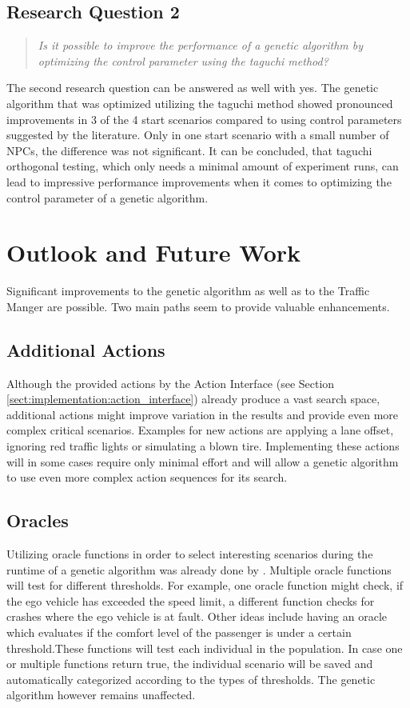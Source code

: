 \subsection{Research Question 2}
\begin{quote}
	\begin{em}
		\textit{Is it possible to improve the performance of a genetic algorithm by optimizing the control parameter using the taguchi method?}
	\end{em}
\end{quote}

The second research question can be answered as well with yes. The genetic algorithm that was optimized utilizing the taguchi method showed pronounced improvements in 3 of the 4 start scenarios compared to using control parameters suggested by the literature. Only in one start scenario with a small number of NPCs, the difference was not significant. It can be concluded, that taguchi orthogonal testing, which only needs a minimal amount of experiment runs, can lead to impressive performance improvements when it comes to optimizing the control parameter of a genetic algorithm.

\section{Outlook and Future Work}
Significant improvements to the genetic algorithm as well as to the Traffic Manger are possible. Two main paths seem to provide valuable enhancements.

\subsection{Additional Actions}
Although the provided actions by the Action Interface (see Section \ref{sect:implementation:action_interface}) already produce a vast search space, additional actions might improve variation in the results and provide even more complex critical scenarios. Examples for new actions are applying a lane offset, ignoring red traffic lights or simulating a blown tire. Implementing these actions will in some cases require only minimal effort and will allow a genetic algorithm to use even more complex action sequences for its search.

\subsection{Oracles}
Utilizing oracle functions in order to select interesting scenarios during the runtime of a genetic algorithm was already done by \cite{almanee_scenorita_2021}. Multiple oracle functions will test for different thresholds. For example, one oracle function might check, if the ego vehicle has exceeded the speed limit, a different function checks for crashes where the ego vehicle is at fault. Other ideas include having an oracle which evaluates if the comfort level of the passenger is under a certain threshold.These functions will test each individual in the population. In case one or multiple functions return true, the individual scenario will be saved and automatically categorized according to the types of thresholds. The genetic algorithm however remains unaffected.

